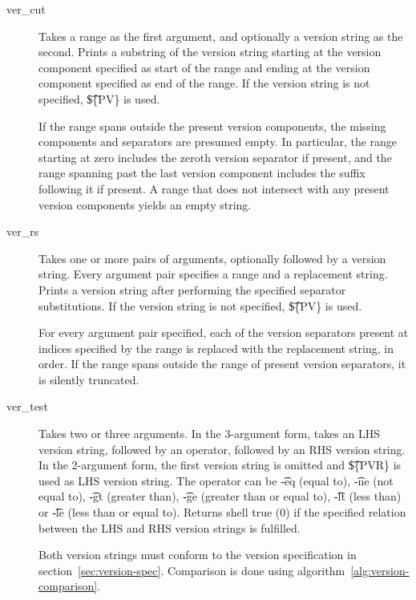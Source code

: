 \begin{description}
\item[ver_cut] Takes a range as the first argument, and optionally a version string as the second.
    Prints a substring of the version string starting at the version component specified as start
    of the range and ending at the version component specified as end of the range. If the version
    string is not specified, \t{\$\{PV\}} is used.

    If the range spans outside the present version components, the missing components and separators
    are presumed empty. In particular, the range starting at zero includes the zeroth version
    separator if present, and the range spanning past the last version component includes the suffix
    following it if present. A range that does not intersect with any present version components
    yields an empty string.

\item[ver_rs] Takes one or more pairs of arguments, optionally followed by a version string.
    Every argument pair specifies a range and a replacement string. Prints a version string after
    performing the specified separator substitutions. If the version string is not specified,
    \t{\$\{PV\}} is used.

    For every argument pair specified, each of the version separators present at indices specified
    by the range is replaced with the replacement string, in order. If the range spans outside
    the range of present version separators, it is silently truncated.

\item[ver_test] Takes two or three arguments. In the 3-argument form, takes an LHS version string,
    followed by an operator, followed by an RHS version string. In the 2-argument form, the first
    version string is omitted and \t{\$\{PVR\}} is used as LHS version string. The operator can be
    \t{-eq} (equal to), \t{-ne} (not equal to), \t{-gt} (greater than), \t{-ge} (greater than or
    equal to), \t{-lt} (less than) or \t{-le} (less than or equal to). Returns shell true (0) if
    the specified relation between the LHS and RHS version strings is fulfilled.

    Both version strings must conform to the version specification in
    section~\ref{sec:version-spec}. Comparison is done using algorithm~\ref{alg:version-comparison}.
\end{description}

